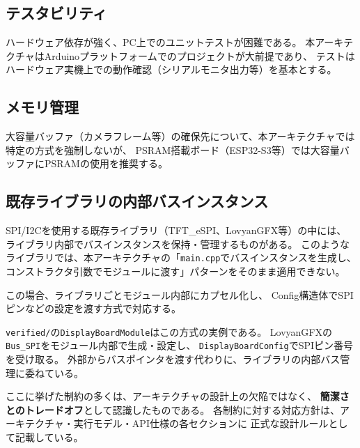 \subsection{テスタビリティ}

ハードウェア依存が強く、PC上でのユニットテストが困難である。
本アーキテクチャはArduinoプラットフォームでのプロジェクトが大前提であり、
テストはハードウェア実機上での動作確認（シリアルモニタ出力等）を基本とする。

\subsection{メモリ管理}

大容量バッファ（カメラフレーム等）の確保先について、本アーキテクチャでは特定の方式を強制しないが、
PSRAM搭載ボード（ESP32-S3等）では大容量バッファにPSRAMの使用を推奨する。

\subsection{既存ライブラリの内部バスインスタンス}

SPI/I2Cを使用する既存ライブラリ（TFT\_eSPI、LovyanGFX等）の中には、
ライブラリ内部でバスインスタンスを保持・管理するものがある。
このようなライブラリでは、本アーキテクチャの「\texttt{main.cpp}でバスインスタンスを生成し、
コンストラクタ引数でモジュールに渡す」パターンをそのまま適用できない。

この場合、ライブラリごとモジュール内部にカプセル化し、
Config構造体でSPIピンなどの設定を渡す方式で対応する。

\begin{notebox}
\texttt{verified/}の\texttt{DisplayBoardModule}はこの方式の実例である。
LovyanGFXの\texttt{Bus\_SPI}をモジュール内部で生成・設定し、
\texttt{DisplayBoardConfig}でSPIピン番号を受け取る。
外部からバスポインタを渡す代わりに、ライブラリの内部バス管理に委ねている。
\end{notebox}

\begin{notebox}[本セクションの位置づけ]
ここに挙げた制約の多くは、アーキテクチャの設計上の欠陥ではなく、
\textbf{簡潔さとのトレードオフ}として認識したものである。
各制約に対する対応方針は、アーキテクチャ・実行モデル・API仕様の各セクションに
正式な設計ルールとして記載している。
\end{notebox}
